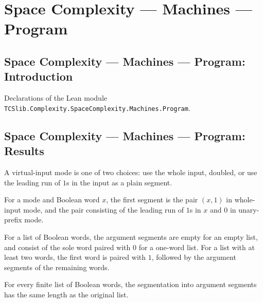 \section{Space Complexity --- Machines --- Program}
\subsection*{Space Complexity --- Machines --- Program: Introduction}

Declarations of the Lean module \texttt{TCSlib.Complexity.SpaceComplexity.Machines.Program}.

\subsection*{Space Complexity --- Machines --- Program: Results}

\begin{definition}
\label{Complexity.LogProg.Mode}
\leanok
A virtual-input mode is one of two choices: use the whole input, doubled, or use the
leading run of $1$s in the input as a plain segment.
\end{definition}

\begin{definition}
\label{Complexity.LogProg.Mode.seg0}
\leanok
{}
For a mode and Boolean word $x$, the first segment is the pair $(x,1)$ in whole-input
mode, and the pair consisting of the leading run of $1$s in $x$ and $0$ in unary-prefix
mode.
\end{definition}

\begin{definition}
\label{Complexity.LogProg.argSegs}
\leanok
{}
For a list of Boolean words, the argument segments are empty for an empty list, and
consist of the sole word paired with $0$ for a one-word list. For a list with at least
two words, the first word is paired with $1$, followed by the argument segments of the
remaining words.
\end{definition}

\begin{lemma}
\label{Complexity.LogProg.length_argSegs}
\leanok
{}
For every finite list of Boolean words, the segmentation into argument segments has the
same length as the original list.
\end{lemma}

